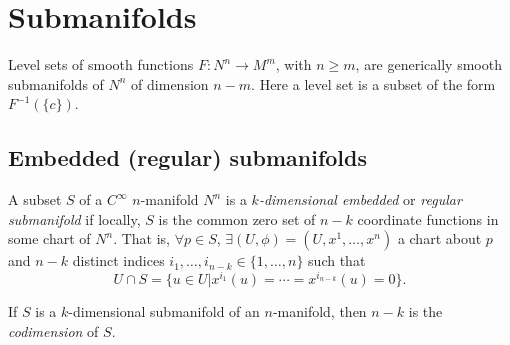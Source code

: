 \section{Submanifolds}
Level sets of smooth functions $F: N^n \to M^m$, with $n \geq m$, are
generically smooth submanifolds of $N^n$ of dimension $n - m$. Here a
level set is a subset of the form $F^{-1}(\{c\})$.

\subsection{Embedded (regular) submanifolds}

\begin{defn}
A subset $S$ of a $C^\infty$ $n$-manifold $N^n$ is a
\emph{$k$-dimensional embedded} or \emph{regular submanifold} if
locally, $S$ is the common zero set of $n - k$ coordinate functions in
some chart of $N^n$. That is,
$\forall p \in S$, $\exists (U, \phi) = (U, x^1, \dots, x^n)$ a chart
about $p$ and $n - k$ distinct indices $i_1, \dots, i_{n-k} \in \{ 1,
\dots, n \}$ such that
$$
U \cap S = \{ u \in U \vert x^{i_1}(u) = \cdots = x^{i_{n-k}}(u) = 0 \}.
$$
\end{defn}

\begin{defn}[Codimension]
If $S$ is a $k$-dimensional submanifold of an $n$-manifold, then $n -
k$ is the \emph{codimension} of $S$.
\end{defn}

